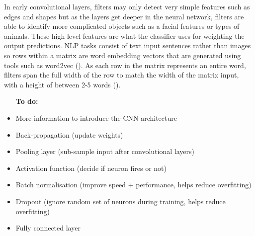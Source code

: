 In early convolutional layers, filters may only detect very simple features such as edges and shapes but as the layers get deeper in the neural network, filters are able to identify more complicated objects such as a facial features or types of animals. These high level features are what the classifier uses for weighting the output predictions.
\acrshort{NLP} tasks consist of text input sentences rather than images so rows within a matrix are word embedding vectors that are generated using tools such as word2vec (\cite{mikolov_word2vec_2013}). 
As each row in the matrix represents an entire word, filters span the full width of the row to match the width of the matrix input, with a height of between 2-5 words (\cite{lopez_deep_2017}).

\begin{itemize}
    \item [\textbf{To do:}]
    \item More information to introduce the CNN architecture
    \item Back-propagation (update weights)
    \item Pooling layer (sub-sample input after convolutional layers)
    \item Activation function (decide if neuron fires or not)
    \item Batch normalisation (improve speed + performance, helps reduce overfitting)
    \item Dropout (ignore random set of neurons during training, helps reduce overfitting)
    \item Fully connected layer
    
\end{itemize}













